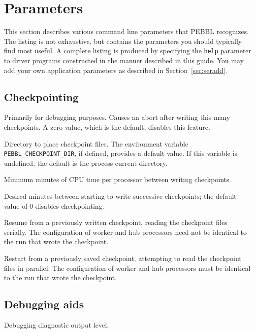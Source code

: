 \section{Parameters}
\label{sec:param}
This section describes various command line parameters that PEBBL
recognizes.  The listing is not exhaustive, but contains the
parameters you should typically find most useful.  A complete listing
is produced by specifying the \texttt{help} parameter to driver
programs constructed in the manner described in this guide.  You may
add your own application parameters as described in Section~\ref{sec:seradd}.


\subsection{Checkpointing}
\vspace{-3ex}
 Primarily for
debugging purposes. Causes an abort after writing this many
checkpoints.  A zero value, which is the default, disables this feature.

 Directory to place checkpoint files.  The environment
variable \texttt{PEBBL\_CHECKPOINT\_DIR}, if defined, provides a
default value.  If this variable is undefined, the default is the process
current directory.

Minimum minutes of CPU time per processor between writing
checkpoints.  

Desired minutes between starting to write successive checkpoints; the default
value of $0$ disables checkpointing.

Resume from a previously written checkpoint, reading the checkpoint
files serially.  The configuration of worker and hub processors need
not be identical to the run that wrote the checkpoint.

 Restart from a previously saved
checkpoint, attempting to read the checkpoint files in parallel.  The
configuration of worker and hub processors must be identical to
the run that wrote the checkpoint.

\subsection{Debugging aids}
\vspace{-3ex}
Debugging diagnostic output level.

